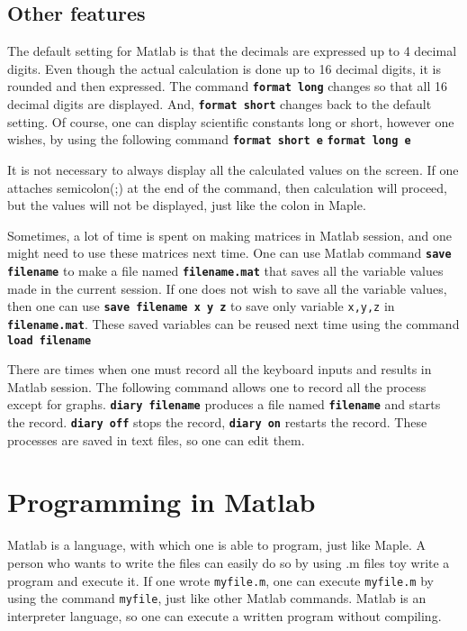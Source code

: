 \subsection{Other features}
The default setting for Matlab is that the decimals are expressed up to 4 decimal digits. Even though the actual calculation is done up to 16 decimal digits, it is rounded and then expressed. The command \matlabp\texttt{\textbf{format long}} \vn changes so that all 16 decimal digits are displayed. And, \matlabp\texttt{\textbf{format short}} \vn changes back to the default setting. Of course, one can display scientific constants long or short, however one wishes, by using the following command \matlabp\texttt{\textbf{format short e}} \matlabp\texttt{\textbf{format long e}}

\vv It is not necessary to always display all the calculated values on the screen. If one attaches semicolon(;) at the end of the command, then calculation will proceed, but the values will not be displayed, just like the colon in Maple.

\vv Sometimes, a lot of time is spent on making matrices in Matlab session, and one might need to use these matrices next time. One can use Matlab command \matlabp\texttt{\textbf{save filename}} \vn to make a file named \texttt{\textbf{filename.mat}} that saves all the variable values made in the current session. If one does not wish to save all the variable values, then one can use \matlabp\texttt{\textbf{save filename x y z}} to save only variable {\tt x,y,z} in \texttt{\textbf{filename.mat}}. These saved variables can be reused next time using the command \matlabp\texttt{\textbf{load filename}}

\vv There are times when one must record all the keyboard inputs and results in Matlab session. The following command allows one to record all the process except for graphs. \matlabp\texttt{\textbf{diary filename}} \vn produces a file named \texttt{\textbf{filename}} and starts the record. \matlabp\texttt{\textbf{diary off}} \vn stops the record, \matlabp\texttt{\textbf{diary on}} \vn restarts the record. These processes are saved in text files, so one can edit them.

\section{Programming in Matlab}
Matlab is a language, with which one is able to program, just like Maple. A person who wants to write the files can easily do so by using .m files toy write a program and execute it. If one wrote {\tt myfile.m}, one can execute {\tt myfile.m} by using the command {\tt myfile}, just like other Matlab commands. Matlab is an interpreter language, so one can execute a written program without compiling.


